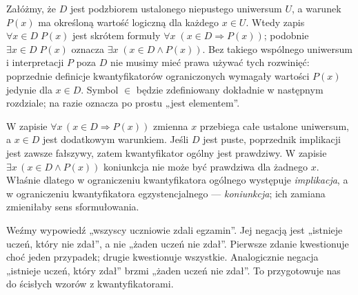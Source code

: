 \begin{uwaga}
Załóżmy, że $D$ jest podzbiorem ustalonego niepustego
uniwersum $U$, a warunek $P(x)$ ma określoną wartość
logiczną dla każdego $x\in U$. Wtedy zapis
$\forall x\in D\;P(x)$ jest skrótem formuły
$\forall x\;(x\in D\Rightarrow P(x))$;
podobnie $\exists x\in D\;P(x)$ oznacza
$\exists x\;(x\in D\land P(x))$.
Bez takiego wspólnego uniwersum i interpretacji $P$
poza $D$ nie musimy mieć prawa używać tych rozwinięć:
poprzednie definicje kwantyfikatorów ograniczonych
wymagały wartości $P(x)$ jedynie dla $x\in D$.
Symbol $\in$ będzie zdefiniowany dokładnie w następnym
rozdziale; na razie oznacza po prostu „jest elementem”.
\end{uwaga}

\begin{uwaga}
W zapisie $\forall x\,(x\in D\Rightarrow P(x))$ zmienna
$x$ przebiega całe ustalone uniwersum, a $x\in D$ jest
dodatkowym warunkiem. Jeśli $D$ jest puste, poprzednik
implikacji jest zawsze fałszywy, zatem kwantyfikator
ogólny jest prawdziwy. W zapisie
$\exists x\,(x\in D\land P(x))$ koniunkcja nie może
być prawdziwa dla żadnego $x$.
Właśnie dlatego w ograniczeniu kwantyfikatora ogólnego
występuje \emph{implikacja}, a w ograniczeniu kwantyfikatora
egzystencjalnego --- \emph{koniunkcja}; ich zamiana
zmieniłaby sens sformułowania.
\end{uwaga}

\begin{przyklad}
Weźmy wypowiedź „wszyscy uczniowie zdali egzamin”.
Jej negacją jest „istnieje uczeń, który nie zdał”, a nie
„żaden uczeń nie zdał”. Pierwsze zdanie kwestionuje choć jeden
przypadek; drugie kwestionuje wszystkie. Analogicznie negacja
„istnieje uczeń, który zdał” brzmi „żaden uczeń nie zdał”.
To przygotowuje nas do ścisłych wzorów z kwantyfikatorami.
\end{przyklad}

